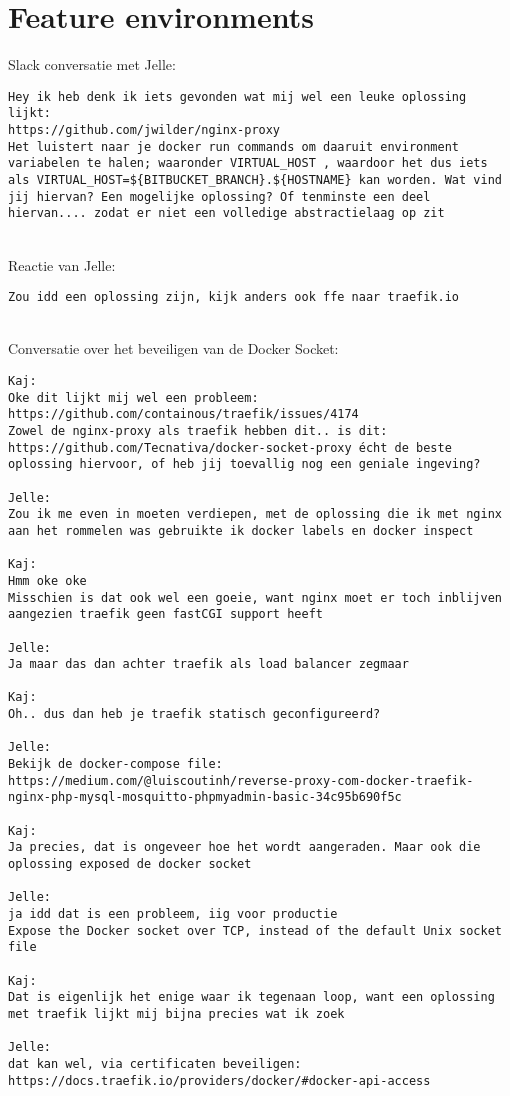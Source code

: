 \section{Feature environments}
\label{FeedbackFeatureEnvironments}

Slack conversatie met Jelle:
\begin{verbatim}
Hey ik heb denk ik iets gevonden wat mij wel een leuke oplossing lijkt:
https://github.com/jwilder/nginx-proxy
Het luistert naar je docker run commands om daaruit environment variabelen te halen; waaronder VIRTUAL_HOST , waardoor het dus iets als VIRTUAL_HOST=${BITBUCKET_BRANCH}.${HOSTNAME} kan worden. Wat vind jij hiervan? Een mogelijke oplossing? Of tenminste een deel hiervan.... zodat er niet een volledige abstractielaag op zit
\end{verbatim}
\\Reactie van Jelle:
\begin{verbatim}
Zou idd een oplossing zijn, kijk anders ook ffe naar traefik.io
\end{verbatim}
\\Conversatie over het beveiligen van de Docker Socket:
\begin{verbatim}
Kaj: 
Oke dit lijkt mij wel een probleem:
https://github.com/containous/traefik/issues/4174
Zowel de nginx-proxy als traefik hebben dit.. is dit: https://github.com/Tecnativa/docker-socket-proxy écht de beste oplossing hiervoor, of heb jij toevallig nog een geniale ingeving?

Jelle:
Zou ik me even in moeten verdiepen, met de oplossing die ik met nginx aan het rommelen was gebruikte ik docker labels en docker inspect

Kaj:
Hmm oke oke
Misschien is dat ook wel een goeie, want nginx moet er toch inblijven aangezien traefik geen fastCGI support heeft

Jelle:
Ja maar das dan achter traefik als load balancer zegmaar

Kaj:
Oh.. dus dan heb je traefik statisch geconfigureerd?

Jelle:
Bekijk de docker-compose file: https://medium.com/@luiscoutinh/reverse-proxy-com-docker-traefik-nginx-php-mysql-mosquitto-phpmyadmin-basic-34c95b690f5c

Kaj:
Ja precies, dat is ongeveer hoe het wordt aangeraden. Maar ook die oplossing exposed de docker socket

Jelle:
ja idd dat is een probleem, iig voor productie
Expose the Docker socket over TCP, instead of the default Unix socket file

Kaj:
Dat is eigenlijk het enige waar ik tegenaan loop, want een oplossing met traefik lijkt mij bijna precies wat ik zoek

Jelle:
dat kan wel, via certificaten beveiligen:
https://docs.traefik.io/providers/docker/#docker-api-access

\end{verbatim}
